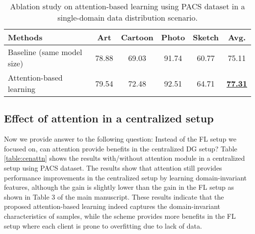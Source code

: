 \documentclass{article}
\theoremstyle{plain}
\theoremstyle{definition}
\theoremstyle{remark}
\begin{document}
\begin{table}[h]
\small
\centering
	\begin{tabular}{l|    cccc | c}
		\toprule  
		Methods   &Art  & Cartoon & Photo & Sketch & Avg. \\ 
		\midrule	
		Baseline (same model size) &78.88& 69.03& 91.74& 60.77& 75.11  \\
		Attention-based learning & 79.54& 72.48& 92.51& 64.71& \textbf{\underline{77.31}}  \\
		
		\bottomrule
	\end{tabular}
\vspace{+3mm}
\caption{Ablation study on attention-based learning using PACS dataset in a single-domain data distribution scenario. } 
\label{table:ablationattention}
\end{table} 


\subsection{Effect of attention in a centralized setup}


Now we provide answer to the following question: Instead of the FL setup we focused on, can attention provide benefits in the centralized DG setup? Table \ref{table:cenattn}  shows the results with/without attention module in a centralized setup using PACS dataset. The results show that attention still provides performance improvements in the centralized setup by learning domain-invariant features, although the gain is slightly lower than the gain in the FL setup as shown in Table 3 of the main manuscript. These results indicate that the proposed attention-based learning indeed captures the domain-invariant characteristics of samples, while the scheme provides more benefits in the FL setup where each client is prone to overfitting due to lack of data.
\end{document}
